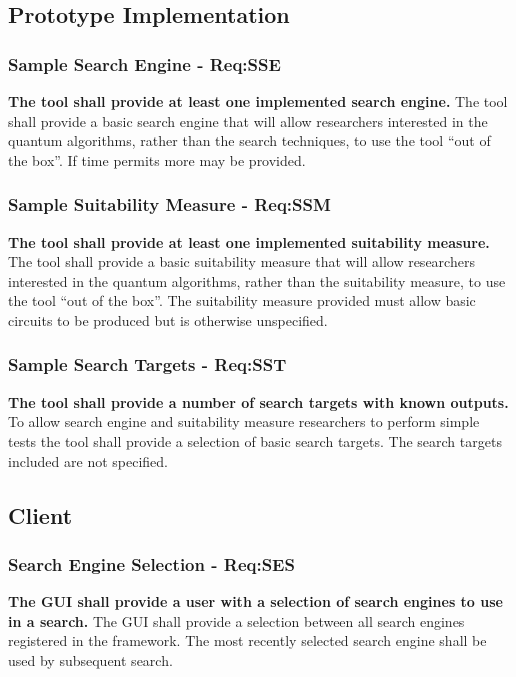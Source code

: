\subsection{Prototype Implementation}
\subsubsection{Sample Search Engine - Req:SSE}
\label{sec:reqsse}
\textbf{The tool shall provide at least one implemented search engine.}
The tool shall provide a basic search engine that will allow researchers interested in the quantum algorithms, rather than the search techniques, to use the tool ``out of the box''.
If time permits more may be provided.

\subsubsection{Sample Suitability Measure - Req:SSM}
\label{sec:reqssm}
\textbf{The tool shall provide at least one implemented suitability measure.}
The tool shall provide a basic suitability measure that will allow researchers interested in the quantum algorithms, rather than the suitability measure, to use the tool ``out of the box''.
The suitability measure provided must allow basic circuits to be produced but is otherwise unspecified.

\subsubsection{Sample Search Targets - Req:SST}
\label{sec:reqsst}
\textbf{The tool shall provide a number of search targets with known outputs.}
To allow search engine and suitability measure researchers to perform simple tests the tool shall provide a selection of basic search targets.
The search targets included are not specified.

\subsection{Client}
\label{sec:clientguireqs}

\subsubsection{Search Engine Selection - Req:SES}
\label{sec:reqses}
\textbf{The GUI shall provide a user with a selection of search engines to use in a search.}
The GUI shall provide a selection between all search engines registered in the framework.
The most recently selected search engine shall be used by subsequent search.


